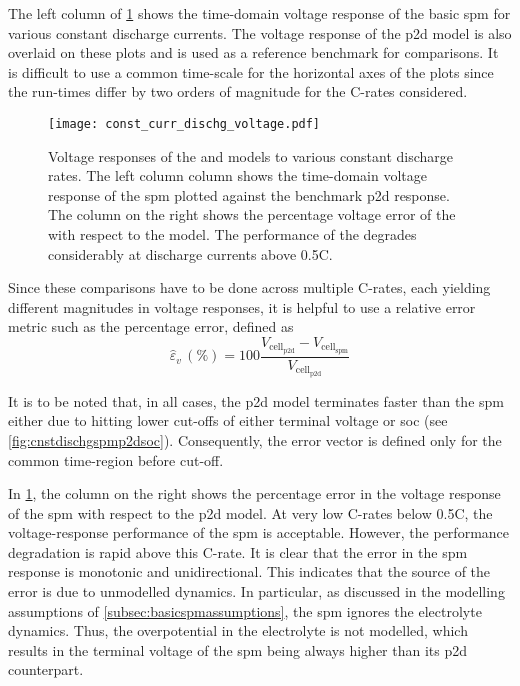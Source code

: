 The  left  column  of \cref{fig:cnstdischgspmp2dvoltage} shows  the  time-domain
voltage response of the basic \gls{spm} for various constant discharge currents.
The voltage response of the \gls{p2d} model  is also overlaid on these plots and
is used  as a  reference benchmark  for comparisons.  It is  difficult to  use a
common  time-scale for  the horizontal  axes of  the plots  since the  run-times
differ by two orders of magnitude for the C-rates considered.

\begin{figure}[!htbp]
    \centering
    \texttt{[image: const\_curr\_dischg\_voltage.pdf]}
    \caption[Voltage responses of  and  to
    constant current discharge]{Voltage responses of the  and
         models to various constant discharge rates. The left
        column column shows the time-domain voltage response of the \gls{spm}
        plotted against the benchmark \gls{p2d} response. The column on the
        right shows the percentage voltage error of the  with
        respect to the  model. The performance of the
         degrades considerably at discharge currents above
    0.5C.}
    \label{fig:cnstdischgspmp2dvoltage}
\end{figure}

Since these comparisons  have to be done across multiple  C-rates, each yielding
different magnitudes in voltage responses, it is helpful to use a relative error
metric such as the percentage error, defined as
\begin{equation}
    \hat{\varepsilon}_v\,(\si{\percent}) = 100\frac{V_{\text{cell}_\text{p2d}} - V_{\text{cell}_\text{spm}}}{V_{\text{cell}_\text{p2d}}}
\end{equation}

It is to be noted that, in all cases, the \gls{p2d} model terminates faster than
the \gls{spm} either due to hitting lower cut-offs of either terminal voltage or
\gls{soc} (see \cref{fig:cnstdischgspmp2dsoc}).  Consequently, the  error vector
is defined only for the common time-region before cut-off.

In  \cref{fig:cnstdischgspmp2dvoltage},  the  column  on  the  right  shows  the
percentage error  in the voltage response  of the \gls{spm} with  respect to the
\gls{p2d} model.  At very  low C-rates  below \approx0.5C,  the voltage-response
performance of the \gls{spm} is acceptable. However, the performance degradation
is rapid above this C-rate. It is clear that the error in the \gls{spm} response
is monotonic and unidirectional. This indicates  that the source of the error is
due  to  unmodelled dynamics.  In  particular,  as  discussed in  the  modelling
assumptions  of  \cref{subsec:basicspmassumptions},  the \gls{spm}  ignores  the
electrolyte  dynamics.  Thus,  the  overpotential  in  the  electrolyte  is  not
modelled, which  results in the terminal  voltage of the \gls{spm}  being always
higher than its \gls{p2d} counterpart.

